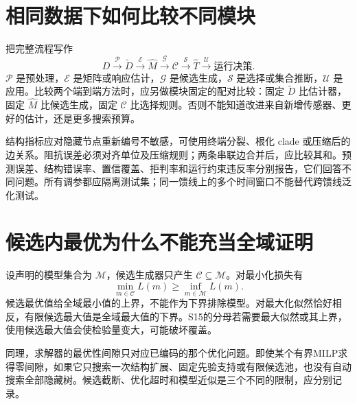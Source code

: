 \documentclass[UTF8,11pt,fontset=fandol,openany,oneside]{ctexbook}
\theoremstyle{definition}
\theoremstyle{remark}
\numberwithin{equation}{chapter}
\begin{document}
\section{相同数据下如何比较不同模块}
把完整流程写作
\begin{equation}
 D\xrightarrow{\mathcal P}\widetilde D
 \xrightarrow{\mathcal E}\widehat M
 \xrightarrow{\mathcal G}\mathcal C
 \xrightarrow{\mathcal S}\widehat T
 \xrightarrow{\mathcal U}\text{运行决策}.
\end{equation}
$\mathcal P$ 是预处理，$\mathcal E$ 是矩阵或响应估计，$\mathcal G$ 是候选生成，$\mathcal S$ 是选择或集合推断，$\mathcal U$ 是应用。比较两个端到端方法时，应另做模块固定的配对比较：固定 $\widetilde D$ 比估计器，固定 $\widehat M$ 比候选生成，固定 $\mathcal C$ 比选择规则。否则不能知道改进来自新增传感器、更好的估计，还是更多搜索预算。

结构指标应对隐藏节点重新编号不敏感，可使用终端分裂、根化 clade 或压缩后的边关系。阻抗误差必须对齐单位及压缩规则；两条串联边合并后，应比较其和。预测误差、结构错误率、置信覆盖、拒判率和运行约束违反率分别报告，它们回答不同问题。所有调参都应隔离测试集；同一馈线上的多个时间窗口不能替代跨馈线泛化测试。

\section{候选内最优为什么不能充当全域证明}
设声明的模型集合为 $\mathcal M$，候选生成器只产生 $\mathcal C\subseteq\mathcal M$。对最小化损失有
\begin{equation}
 \min_{m\in\mathcal C}L(m)\geq\inf_{m\in\mathcal M}L(m).
 \label{eq:tb-candidate-bound}
\end{equation}
候选最优值给全域最小值的上界，不能作为下界排除模型。对最大化似然恰好相反，有限候选最大值是全域最大值的下界。S15的分母若需要最大似然或其上界，使用候选最大值会使检验量变大，可能破坏覆盖。

同理，求解器的最优性间隙只对应已编码的那个优化问题。即使某个有界MILP求得零间隙，如果它只搜索一次结构扩展、固定先验支持或有限候选池，也没有自动搜索全部隐藏树。候选截断、优化超时和模型近似是三个不同的限制，应分别记录。
\end{document}
